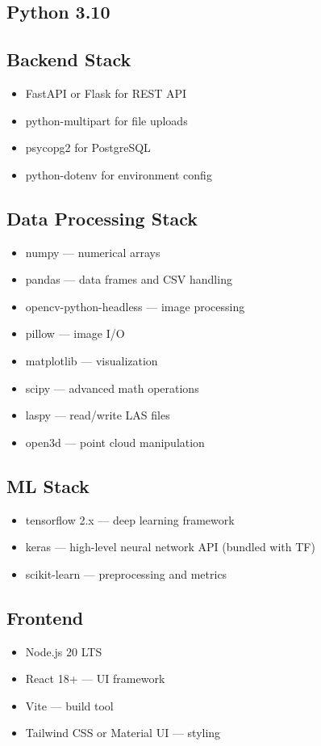 \documentclass{article}
\begin{document}
\subsection{Python 3.10}
\subsection{Backend Stack}
\begin{itemize}
  \item FastAPI or Flask for REST API
  \item python-multipart for file uploads
  \item psycopg2 for PostgreSQL
  \item python-dotenv for environment config
\end{itemize}

\subsection{Data Processing Stack}
\begin{itemize}
  \item numpy — numerical arrays
  \item pandas — data frames and CSV handling
  \item opencv-python-headless — image processing
  \item pillow — image I/O
  \item matplotlib — visualization
  \item scipy — advanced math operations
  \item laspy — read/write LAS files
  \item open3d — point cloud manipulation
\end{itemize}

\subsection{ML Stack}
\begin{itemize}
  \item tensorflow 2.x — deep learning framework
  \item keras — high-level neural network API (bundled with TF)
  \item scikit-learn — preprocessing and metrics
\end{itemize}

\subsection{Frontend}
\begin{itemize}
  \item Node.js 20 LTS
  \item React 18+ — UI framework
  \item Vite — build tool
  \item Tailwind CSS or Material UI — styling
\end{itemize}
\end{document}
